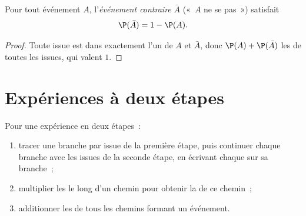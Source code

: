 \begin{proposition}[Complément]\label{prop:g9:statproba:complement}
Pour tout événement $A$, l'\emph{événement contraire} $\bar A$ («~$A$ ne
se  pas~») satisfait
\[
\P(\bar A) = 1 - \P(A).
\]
\end{proposition}

\begin{proof}
Toute issue est dans exactement l'un de $A$ et $\bar A$, donc
$\P(A) + \P(\bar A)$  les  de toutes les issues, qui
valent $1$.
\end{proof}

\section{Expériences à deux étapes}

\begin{method}\label{met:g9:statproba:tree}
Pour une expérience en deux étapes~:
\begin{enumerate}
  \item tracer une branche par issue de la première étape, puis
        continuer chaque branche avec les issues de la seconde étape, en
        écrivant chaque  sur sa branche~;
  \item multiplier les  le long d'un chemin pour obtenir la
         de ce chemin~;
  \item additionner les  de tous les chemins formant un
        événement.
\end{enumerate}
\end{method}

